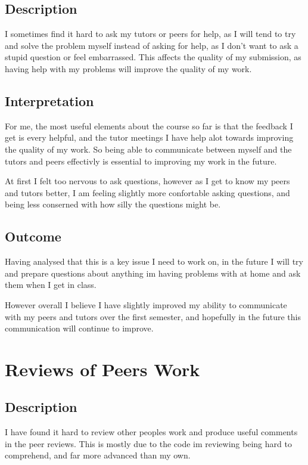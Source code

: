 \documentclass{scrartcl}
\begin{document}
\subsection{Description} 

I sometimes find it hard to ask my tutors or peers for help, as I will tend to try and solve the problem myself instead of asking for help, as I don't want to ask a stupid question or feel embarrassed. This affects the quality of my submission, as having help with my problems will improve the quality of my work.

\subsection{Interpretation} 

For me, the most useful elements about the course so far is that the feedback I get is every helpful, and the tutor meetings I have help alot towards improving the quality of my work. So being able to communicate between myself and the tutors and peers effectivly is essential to improving my work in the future.

At first I felt too nervous to ask questions, however as I get to know my peers and tutors better, I am feeling slightly more confortable asking questions, and being less conserned with how silly the questions might be.

\subsection{Outcome} 

Having analysed that this is a key issue I need to work on, in the future I will try and prepare questions about anything im having problems with at home and ask them when I get in class.

However overall I believe I have slightly improved my ability to communicate with my peers and tutors over the first semester, and hopefully in the future this communication will continue to improve. 

\section{Reviews of Peers Work}

\subsection{Description} 

I have found it hard to review other peoples work and produce useful comments in the peer reviews. This is mostly due to the code im reviewing being hard to comprehend, and far more advanced than my own.
\end{document}
